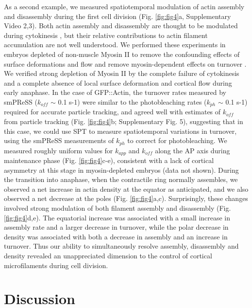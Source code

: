  As a second example, we measured spatiotemporal modulation of actin assembly and disassembly during the first cell division (Fig. \ref{fig:fig4}a, Supplementary Video 2,3). Both actin assembly and disassembly are thought to be modulated during cytokinesis \cite{nmeth32}, but their relative contributions to actin filament accumulation are not well understood. We performed these experiments in embryos depleted of non-muscle Myosin II to remove the confounding effects of surface deformations and flow and remove myosin-dependent effects on turnover \cite{nmeth3,nmeth4}. We verified strong depletion of Myosin II by the complete failure of cytokinesis and a complete absence of local surface deformation and cortical flow during early anaphase. In the case of GFP::Actin, the turnover rates measured by smPReSS ($k_{off}$ $\sim$ 0.1 s-1) were similar to the photobleaching rates ($k_{ph}$ $\sim$ 0.1 s-1) required for accurate particle tracking, and agreed well with estimates of $k_{off}$ from particle tracking (Fig. \ref{fig:fig4}b; Supplementary Fig. 5), suggesting that in this case, we could use SPT to measure spatiotemporal variations in turnover, using the smPReSS measurements of $k_{ph}$ to correct for photobleaching. We measured roughly uniform values for $k_{app}$ and $k_{off}$ along the AP axis during maintenance phase (Fig. \ref{fig:fig4}c-e), consistent with a lack of cortical asymmetry at this stage in myosin-depleted embryos (data not shown). During the transition into anaphase, when the contractile ring normally assembles, we observed a net increase in actin density at the equator as anticipated, and we also observed a net decrease at the poles (Fig. \ref{fig:fig4}a,c). Surprisingly, these changes involved strong modulation of both filament assembly and disassembly (Fig. \ref{fig:fig4}d,e). The equatorial increase was associated with a small increase in assembly rate and a larger decrease in turnover, while the polar decrease in density was associated with both a decrease in assembly and an increase in turnover. Thus our ability to simultaneously resolve assembly, disassembly and density revealed an unappreciated dimension to the control of cortical microfilaments during cell division.
 
 
 \section{Discussion}
 

